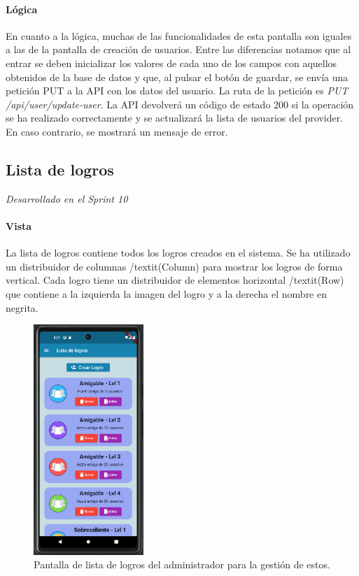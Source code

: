 \paragraph*{Lógica}
En cuanto a la lógica, muchas de las funcionalidades de esta pantalla son iguales a las de la pantalla de creación de usuarios.
Entre las diferencias notamos que al entrar se deben inicializar los valores de cada uno de los campos con aquellos obtenidos de la base de datos y que, al pulsar el botón de guardar, se envía una petición PUT a la API con los datos del usuario. La ruta de la petición es \textit{PUT /api/user/update-user}. La API devolverá un código de estado 200 si la operación se ha realizado correctamente y se actualizará la lista de usuarios del provider. En caso contrario, se mostrará un mensaje de error.


\subsection{Lista de logros} 

\textit{Desarrollado en el Sprint 10}
\paragraph*{Vista}
La lista de logros contiene todos los logros creados en el sistema. Se ha utilizado un distribuidor de columnas /textit{(Column)} para mostrar los logros de forma vertical. 
Cada logro tiene un distribuidor de elementos horizontal /textit{(Row)} que contiene a la izquierda la imagen del logro y a la derecha el nombre en negrita. 

\begin{figure}[H]
  \centering
  \includegraphics[width=0.37\textwidth]{imagenes/c7/listalogros.png}
  \caption{Pantalla de lista de logros del administrador para la gestión de estos.} 
  \label{fig:listalogros}
\end{figure}


